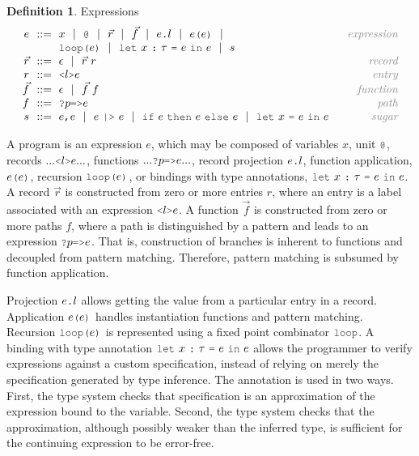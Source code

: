 \documentclass[acmsmall]{acmart}
\theoremstyle{definition}
\newtheorem{definition}{Definition}[section]
\begin{document}
\begin{definition} Expressions
  \label{def:expressions}
  \[\begin{array}[t]{r@{}l@{}r}
    \nonterm{e} 
    & 
    \is 
    \begin{array}[t]{@{}l}
      x \sep 
      \J{@} \sep
      \vec{r} \sep
      \vec{f} \sep 
      e\J{.}l \sep
      e\J{(}e\J{)} \sep
      \\
      \J{loop(}e\J{)} \sep
      \J{let}\ x\ \J{:}\ \tau\ \J{=}\ e\ \J{in}\ e \sep
      s
    \end{array}
    & \com{expression}
    \\
    \nonterm{\vec{r}} & \is \epsilon \sep \vec{r}\ r 
    & \com{record}
    \\
    \nonterm{r} & \is \J{<}l\J{>}e
    & \com{entry}
    \\
    \nonterm{\vec{f}} & \is \epsilon \sep \vec{f}\ f
    & \com{function}
    \\
    \nonterm{f} & \is \J{?}p\J{=>}e
    & \com{path}
    \\
    \nonterm{s} 
    & 
    \is 
    \begin{array}[t]{@{}l}
      e \J{,} e \sep
      e\ \J{|>}\ e \sep
      \J{if}\ e\ \J{then}\ e\ \J{else}\ e \sep
      \J{let}\ x\ \J{=}\ e\ \J{in}\ e
    \end{array}
    & \com{sugar}
  \end{array}\]
\end{definition}
A program is an expression $e$, which may be composed of variables $x$, unit $\J{@}$,
records $... \J{<}l\J{>} e ...$, functions $...\J{?}p \J{=>} e ...$, record
projection $e\J{.}l$, function application, $e\J{(}e\J{)}$, recursion $\J{loop(}e\J{)}$,
or bindings with type annotations, $\J{let}\ x\ \J{:}\ \tau\ \J{=}\ e\ \J{in}\ e$.
A record $\vec{r}$ is constructed from zero or more entries $r$, where an entry
is a label associated with an expression $\J{<}l\J{>}e$.
A function $\vec{f}$ is constructed from zero or more paths $f$, where a path is distinguished by a pattern
and leads to an expression $\J{?}p \J{=>} e$.
That is, construction of branches is inherent to functions and decoupled from pattern matching.
Therefore, pattern matching is subsumed by function application.

Projection $e\J{.}l$ allows getting the value from a particular entry in a record. 
Application $e\J{(}e\J{)}$ handles instantiation functions and pattern matching. 
Recursion $\J{loop(}e\J{)}$ is represented using a fixed point combinator $\J{loop}$.
A binding with type annotation $\J{let}\ x\ \J{:}\ \tau\ \J{=}\ e\ \J{in}\ e$ allows the programmer 
to verify expressions against a custom specification, instead of relying on merely 
the specification generated by type inference.
The annotation is used in two ways. First, the type system checks that specification is an approximation
of the expression bound to the variable. Second, the type system checks that the approximation,
although possibly weaker than the inferred type, is sufficient for the continuing expression to be error-free. 
\end{document}
